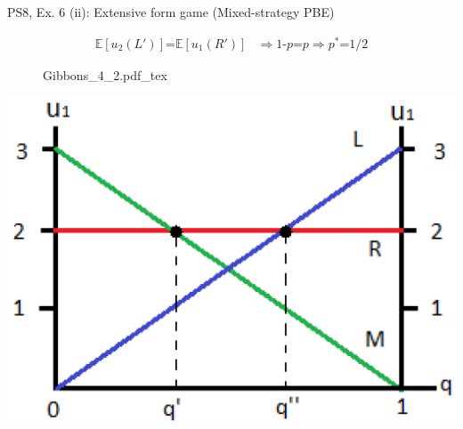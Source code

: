 \begin{frame}{PS8, Ex. 6 (ii): Extensive form game (Mixed-strategy PBE)}
\begin{multicols}{2}
      \begin{align*}
        \mathbb{E}[u_2(L')]\text{=}\mathbb{E}[u_1(R')]&\Rightarrow \text{1-}p\text{=}p\Rightarrow p^*\text{=}1/2
      \end{align*}
      \vfill\null\columnbreak
      \begin{figure}[!h]
        \center {}
        {Gibbons_4_2.pdf_tex}
      \end{figure}
      \includegraphics[width=1.1\columnwidth]{figures/Gibbons_4_2_E[u]}
      \vfill\null
    \end{multicols}
\end{frame}
